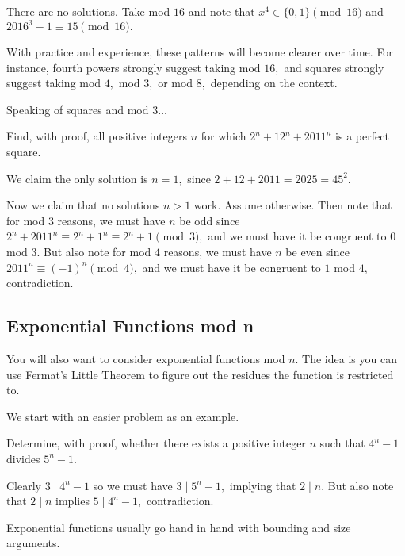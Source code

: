 \documentclass[mast]{lucky}
\begin{document}
\begin{sol}
There are no solutions. Take mod $16$ and note that $x^4\in \{0,1\}\pmod{16}$ and $2016^3-1\equiv 15\pmod{16}.$
\end{sol}

With practice and experience, these patterns will become clearer over time. For instance, fourth powers strongly suggest taking mod $16,$ and squares strongly suggest taking mod $4,$ mod $3,$ or mod $8,$ depending on the context.

Speaking of squares and mod $3\ldots$

\begin{exam}[USAJMO 2011/1]
Find, with proof, all positive integers $n$ for which $2^n + 12^n + 2011^n$ is a perfect square.
\end{exam}

\begin{sol}
We claim the only solution is $n=1,$ since $2+12+2011=2025=45^2.$

Now we claim that no solutions $n>1$ work. Assume otherwise. Then note that for mod $3$ reasons, we must have $n$ be odd since $2^n+2011^n\equiv 2^n+1^n\equiv 2^n+1\pmod{3},$ and we must have it be congruent to $0$ mod $3.$ But also note for mod $4$ reasons, we must have $n$ be even since $2011^n\equiv (-1)^n\pmod{4},$ and we must have it be congruent to $1$ mod $4,$ contradiction.
\end{sol}

\subsection{Exponential Functions mod n}
You will also want to consider exponential functions mod $n.$ The idea is you can use Fermat's Little Theorem to figure out the residues the function is restricted to.

We start with an easier problem as an example.

\begin{exam}
Determine, with proof, whether there exists a positive integer $n$ such that $4^n-1$ divides $5^n-1.$
\end{exam}

\begin{sol}
Clearly $3\mid 4^n-1$ so we must have $3\mid 5^n-1,$ implying that $2\mid n.$ But also note that $2\mid n$ implies $5\mid 4^n-1,$ contradiction.
\end{sol}
Exponential functions usually go hand in hand with bounding and size arguments.
\end{document}

